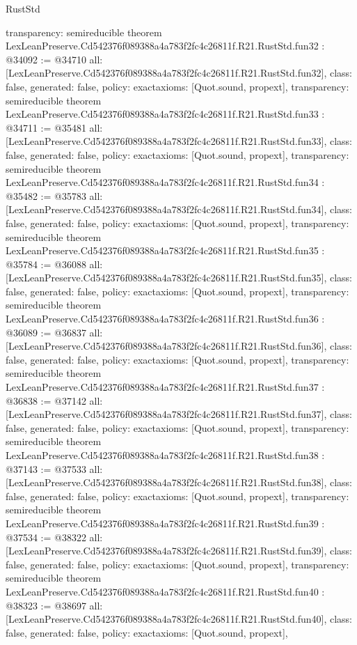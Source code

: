 \begin{lexlean}{RustStd}
\begin{coremodule}
{  transparency: semireducible
}
theorem LexLeanPreserve.Cd542376f089388a4a783f2fc4c26811f.R21.RustStd.fun32 : @34092 := @34710 {
  all: [LexLeanPreserve.Cd542376f089388a4a783f2fc4c26811f.R21.RustStd.fun32],
  class: false,
  generated: false,
  policy: exact{axioms: [Quot.sound, propext]},
  transparency: semireducible
}
theorem LexLeanPreserve.Cd542376f089388a4a783f2fc4c26811f.R21.RustStd.fun33 : @34711 := @35481 {
  all: [LexLeanPreserve.Cd542376f089388a4a783f2fc4c26811f.R21.RustStd.fun33],
  class: false,
  generated: false,
  policy: exact{axioms: [Quot.sound, propext]},
  transparency: semireducible
}
theorem LexLeanPreserve.Cd542376f089388a4a783f2fc4c26811f.R21.RustStd.fun34 : @35482 := @35783 {
  all: [LexLeanPreserve.Cd542376f089388a4a783f2fc4c26811f.R21.RustStd.fun34],
  class: false,
  generated: false,
  policy: exact{axioms: [Quot.sound, propext]},
  transparency: semireducible
}
theorem LexLeanPreserve.Cd542376f089388a4a783f2fc4c26811f.R21.RustStd.fun35 : @35784 := @36088 {
  all: [LexLeanPreserve.Cd542376f089388a4a783f2fc4c26811f.R21.RustStd.fun35],
  class: false,
  generated: false,
  policy: exact{axioms: [Quot.sound, propext]},
  transparency: semireducible
}
theorem LexLeanPreserve.Cd542376f089388a4a783f2fc4c26811f.R21.RustStd.fun36 : @36089 := @36837 {
  all: [LexLeanPreserve.Cd542376f089388a4a783f2fc4c26811f.R21.RustStd.fun36],
  class: false,
  generated: false,
  policy: exact{axioms: [Quot.sound, propext]},
  transparency: semireducible
}
theorem LexLeanPreserve.Cd542376f089388a4a783f2fc4c26811f.R21.RustStd.fun37 : @36838 := @37142 {
  all: [LexLeanPreserve.Cd542376f089388a4a783f2fc4c26811f.R21.RustStd.fun37],
  class: false,
  generated: false,
  policy: exact{axioms: [Quot.sound, propext]},
  transparency: semireducible
}
theorem LexLeanPreserve.Cd542376f089388a4a783f2fc4c26811f.R21.RustStd.fun38 : @37143 := @37533 {
  all: [LexLeanPreserve.Cd542376f089388a4a783f2fc4c26811f.R21.RustStd.fun38],
  class: false,
  generated: false,
  policy: exact{axioms: [Quot.sound, propext]},
  transparency: semireducible
}
theorem LexLeanPreserve.Cd542376f089388a4a783f2fc4c26811f.R21.RustStd.fun39 : @37534 := @38322 {
  all: [LexLeanPreserve.Cd542376f089388a4a783f2fc4c26811f.R21.RustStd.fun39],
  class: false,
  generated: false,
  policy: exact{axioms: [Quot.sound, propext]},
  transparency: semireducible
}
theorem LexLeanPreserve.Cd542376f089388a4a783f2fc4c26811f.R21.RustStd.fun40 : @38323 := @38697 {
  all: [LexLeanPreserve.Cd542376f089388a4a783f2fc4c26811f.R21.RustStd.fun40],
  class: false,
  generated: false,
  policy: exact{axioms: [Quot.sound, propext]},
}
\end{coremodule}
\end{lexlean}
